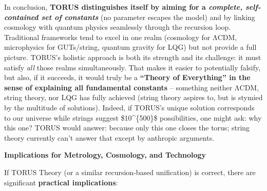 \documentclass[]{article}
\begin{document}
In conclusion, \textbf{TORUS distinguishes itself by aiming for a
\emph{complete, self-contained set of constants}} (no parameter escapes
the model) and by linking cosmology with quantum physics seamlessly
through the recursion loop​. Traditional frameworks tend to excel in one
realm (cosmology for ΛCDM, microphysics for GUTs/string, quantum gravity
for LQG) but not provide a full picture. TORUS's holistic approach is
both its strength and its challenge: it must satisfy \emph{all} those
realms simultaneously. That makes it easier to potentially falsify, but
also, if it succeeds, it would truly be a \textbf{``Theory of
Everything'' in the sense of explaining all fundamental constants} --
something neither ΛCDM, string theory, nor LQG has fully achieved
(string theory aspires to, but is stymied by the multitude of
solutions)​. Indeed, if TORUS's unique solution corresponds to our
universe while strings suggest \$10\^{}\{500\}\$ possibilities, one
might ask: why this one? TORUS would answer: because only this one
closes the torus; string theory currently can't answer that except by
anthropic arguments.

\textbf{Implications for Metrology, Cosmology, and Technology}

If TORUS Theory (or a similar recursion-based unification) is correct,
there are significant \textbf{practical implications}:
\end{document}
